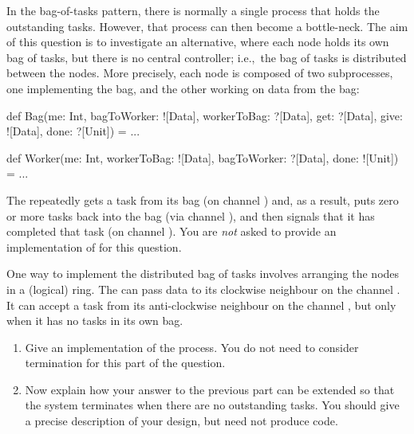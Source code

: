 \begin{question}
In the bag-of-tasks pattern, there is normally a single process that holds the
outstanding tasks.  However, that process can then become a bottle-neck.  The
aim of this question is to investigate an alternative, where each node holds
its own bag of tasks, but there is no central controller; i.e.,\ the bag of
tasks is distributed between the nodes.
%
More precisely, each node is composed of two subprocesses, one implementing
the bag, and the other working on data from the bag:
%
\begin{scala}
  def Bag(me: Int, bagToWorker: ![Data], workerToBag: ?[Data], 
          get: ?[Data], give: ![Data], done: ?[Unit]) = ...

  def Worker(me: Int, workerToBag: ![Data], 
             bagToWorker: ?[Data], done: ![Unit]) = ...
\end{scala}
%
The  repeatedly gets a task from its bag (on channel
) and, as a result, puts zero or more tasks back into the
bag (via channel ), and then signals that it has completed
that task (on channel ).  You are \emph{not} asked to provide an
implementation of  for this question.

One way to implement the distributed bag of tasks involves arranging the nodes
in a (logical) ring.  The  can pass data to its clockwise neighbour
on the channel .  It can accept a task from its anti-clockwise
neighbour on the channel , but only when it has no tasks in its
own bag.

\begin{enumerate}
\item
Give an implementation of the  process.  You do not need to
consider termination for this part of the question.           

\item
Now explain how your answer to the previous part can be extended so that the
system terminates when there are no outstanding tasks.  You should give a
precise description of your design, but need not produce code.  
\end{enumerate}


\end{question}
